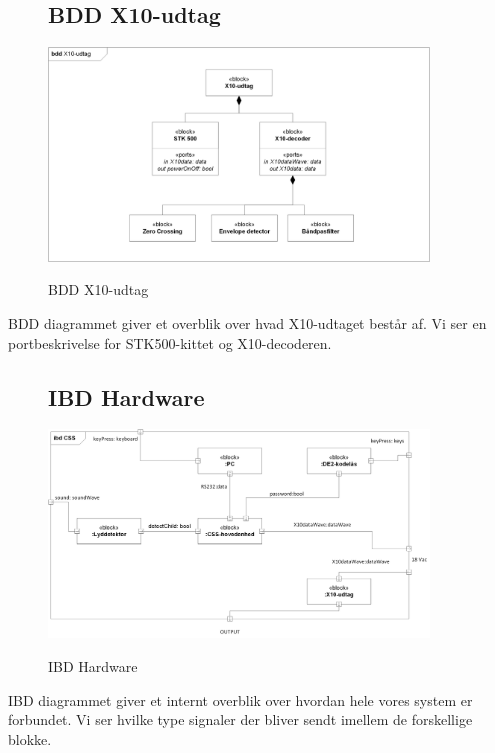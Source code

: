 \begin{figure}[H] \centering
\subsection{BDD X10-udtag}
{\includegraphics[width=0.9\textwidth]{billeder/diagrammer/BDD_Modtager}}
\caption{BDD X10-udtag}
\label{lab:bddmodtager}
\raggedright
\end{figure}
BDD diagrammet giver et overblik over hvad X10-udtaget består af. Vi ser en portbeskrivelse for STK500-kittet og X10-decoderen.

\begin{figure}[H] \centering
\subsection{IBD Hardware}
{\includegraphics[width=0.9\textwidth]{billeder/diagrammer/IBD_Hardware}}
\caption{IBD Hardware}
\label{lab:ibdhardware}
\raggedright
\end{figure}
IBD diagrammet giver et internt overblik over hvordan hele vores system er forbundet. Vi ser hvilke type signaler der bliver sendt imellem de forskellige blokke.

